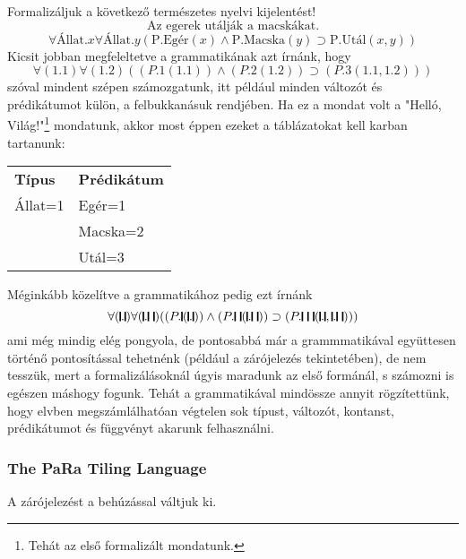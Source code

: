 \documentclass[a4paper]{article}
\begin{document}
{

\begin{pelda}
Formalizáljuk a következő természetes nyelvi kijelentést!
$$
\text{Az egerek utálják a macskákat.}
$$
$$\forall \text{Állat.}x \forall \text{Állat.}y ( \text{P.Egér}(x) \wedge \text{P.Macska}(y)  \supset \text{P.Utál}(x, y))$$
Kicsit jobban megfeleltetve a grammatikának azt írnánk, hogy
$$\forall (1.1) \forall (1.2) (
(P.1 (1.1)) \wedge (P.2 (1.2))
\supset
(P.3(1.1, 1.2))
)$$
szóval mindent szépen számozgatunk, itt például minden változót és prédikátumot külön, a felbukkanásuk rendjében. Ha ez a mondat volt a "Helló, Világ!"\footnote{Tehát az els\H o formalizált mondatunk.} mondatunk, akkor most éppen ezeket a táblázatokat kell karban tartanunk:

\begin{center}
\begin{tabular}{ll}
\centering
\textbf{Típus} & \textbf{Prédikátum}\\
Állat=1& Egér=1\\
& Macska=2\\
& Utál=3
\end{tabular}
\end{center}

Méginkább közelítve a grammatikához pedig ezt írnánk
$$\forall (\stick . \stick) \forall (\stick . \stick \ \stick) (
(P . \stick (\stick . \stick)) \wedge (P . \stick \ \stick (\stick . \stick \ \stick))
\supset
(P . \stick \ \stick \ \stick(\stick . \stick, \stick . \stick \ \stick))
)$$
ami még mindig elég pongyola, de pontosabbá már a grammmatikával együttesen
történ\H o pontosítással tehetnénk (például a zárójelezés tekintetében), de nem tesszük, mert a formalizálásoknál úgyis maradunk az els\H o formánál, s számozni is egészen máshogy fogunk. Tehát a grammatikával mindössze annyit rögzítettünk, hogy elvben megszámlálhatóan végtelen sok típust, változót, kontanst, prédikátumot és függvényt akarunk felhasználni.
\end{pelda}
}

\subsubsection{The PaRa Tiling Language}

A zárójelezést a behúzással váltjuk ki.
\end{document}
